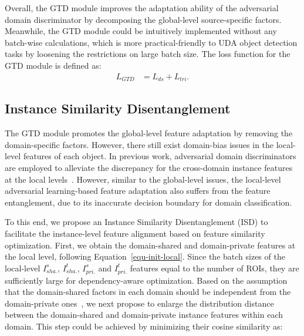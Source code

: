 \documentclass[journal]{IEEEtran}
\begin{document}
Overall, the GTD module improves the adaptation ability of the adversarial domain discriminator by decomposing the global-level source-specific factors. Meanwhile, the GTD module could be intuitively implemented without any batch-wise calculations, which is more practical-friendly to UDA object detection tasks by loosening the restrictions on large batch size. The loss function for the GTD module is defined as:
\begin{equation}
\begin{aligned}
L_{GTD} & =  L_{ds} + L_{tri}.
\label{equ-GTD}
\end{aligned}
\end{equation}




\subsection{Instance Similarity Disentanglement}

The GTD module promotes the global-level feature adaptation by removing the domain-specific factors. However, there still exist domain-bias issues in the local-level features of each object. In previous work, adversarial domain discriminators are employed to alleviate the discrepancy for the cross-domain instance features at the local levels~\cite{chen2018domain,he2019multi}. However, similar to the global-level issues, the local-level adversarial learning-based feature adaptation also suffers from the feature entanglement, due to its inaccurate decision boundary for domain classification. 

To this end, we propose an Instance Similarity Disentanglement (ISD) to facilitate the instance-level feature alignment based on feature similarity optimization. First, we obtain the domain-shared and domain-private features at the local level, following Equation~\ref{equ-init-local}. Since the batch sizes of the local-level $I_{sha.}^{s}$, $I_{sha.}^{t}$, $I_{pri.}^{s}$ and $I_{pri.}^{t}$ features equal to the number of ROIs, they are sufficiently large for dependency-aware optimization. Based on the assumption that the domain-shared factors in each domain should be independent from the domain-private ones~\cite{bousmalis2016domain,cai2019learning,peng2019domain}, we next propose to enlarge the distribution distance between the domain-shared and domain-private instance features within each domain. This step could be achieved by minimizing their cosine similarity as:
\end{document}
